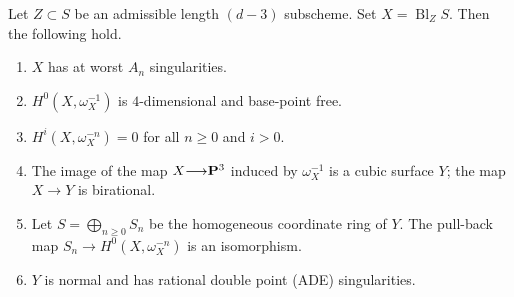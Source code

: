 \documentclass[reqno]{amsart}
\DeclareMathOperator{\Bl}{Bl}
\renewcommand{\to}{{\longrightarrow}}
\renewcommand {\P}{{\bf P}}
\numberwithin{equation}{section}
\begin{document}
\begin{proposition}
  \label{prop:admissibleblowup}
Let $Z \subset S$ be an admissible length $(d-3)$ subscheme.
Set $X = \Bl_ZS$.
Then the following hold.
\begin{enumerate}
\item $X$ has at worst $A_n$ singularities.
\item $H^0\left(X, \omega^{-1}_X\right)$ is $4$-dimensional and base-point free.
\item $H^i(X,\omega_X^{-n}) = 0$ for all $n \geq 0$ and $i > 0$.
\item The image of the map $X \to \P^3$ induced by $\omega_X^{-1}$ is a cubic surface $Y$; the map $X \to Y$ is birational.
\item Let $S = \bigoplus_{n \geq 0} S_n$ be the homogeneous coordinate ring of $Y$.
  The pull-back map $S_n \to H^0\left(X, \omega_X^{-n}\right)$ is an isomorphism.
\item $Y$ is normal and has rational double point (ADE) singularities.
\end{enumerate}
\end{proposition}
\end{document}
